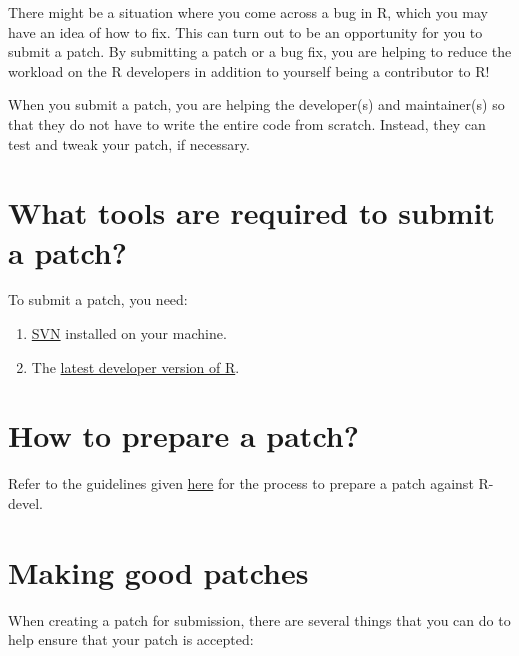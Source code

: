 \documentclass[
]{book}
\begin{document}
There might be a situation where you come across a bug in R, which you may have an idea of how to fix. This can turn out to be an opportunity for you to submit a patch. By submitting a patch or a bug fix, you are helping to reduce the workload on the R developers in addition to yourself being a contributor to R!

When you submit a patch, you are helping the developer(s) and maintainer(s) so that they do not have to write the entire code from scratch. Instead, they can test and tweak your patch, if necessary.

\hypertarget{what-tools-are-required-to-submit-a-patch}{%
\section{What tools are required to submit a patch?}\label{what-tools-are-required-to-submit-a-patch}}

To submit a patch, you need:

\begin{enumerate}
\def\labelenumi{\arabic{enumi}.}
\item
  \href{http://subversion.apache.org/}{SVN} installed on your machine.
\item
  The \protect\hyperlink{installR}{latest developer version of R}.
\end{enumerate}

\hypertarget{how-to-prepare-a-patch}{%
\section{How to prepare a patch?}\label{how-to-prepare-a-patch}}

Refer to the guidelines given \href{https://www.r-project.org/bugs.html\#how-to-submit-patches}{here} for the process to prepare a patch against R-devel.

\hypertarget{GoodPatches}{%
\section{Making good patches}\label{GoodPatches}}

When creating a patch for submission, there are several things that you can do to help ensure that your patch is accepted:
\end{document}
